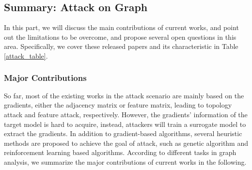 \subsection{Summary: Attack on Graph}
In this part, we will discuss the main contributions of current works, and point out the limitations to be overcome, and propose several open questions in this area. Specifically, we cover these released papers and its characteristic in Table \ref{attack_table}.

\subsubsection{Major Contributions}
So far, most of the existing works in the attack scenario are mainly based on the gradients,  either the adjacency matrix or feature matrix, leading to topology attack and feature attack, respectively. However, the gradients' information of the target model is hard to acquire, instead, attackers will train a surrogate model to extract the gradients. In addition to gradient-based algorithms, several heuristic methods are proposed to achieve the goal of attack, such as  genetic algorithm \cite{whitley1994genetic} and reinforcement learning \cite{sutton2018reinforcement} based algorithms. According to different tasks in graph analysis, we summarize the major contributions of current works in the following.

